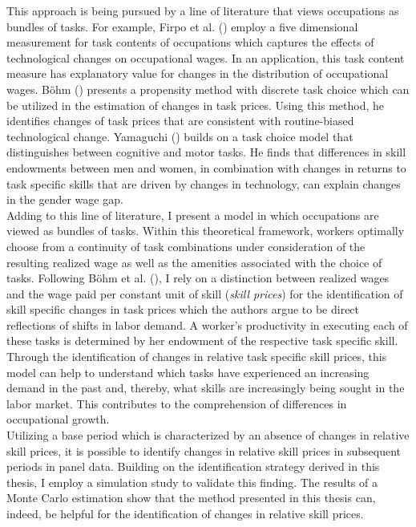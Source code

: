 \documentclass[../main.tex]{subfiles}
\begin{document}
This approach is being pursued by a line of literature that views occupations as bundles of tasks. For example, Firpo et al. (\citeyear{firpo2011occupational}) employ a five dimensional measurement for task contents of occupations which captures the effects of technological changes on occupational wages. In an application, this task content measure has explanatory value for changes in the distribution of occupational wages. Böhm (\citeyear{bohm2019price}) presents a propensity method with discrete task choice which can be utilized in the estimation of changes in task prices. Using this method, he identifies changes of task prices that are consistent with routine-biased technological change. Yamaguchi (\citeyear{yamaguchi2018changes}) builds on a task choice model that distinguishes between cognitive and motor tasks. He finds that differences in skill endowments between men and women, in combination with changes in returns to task specific skills that are driven by changes in technology, can explain changes in the gender wage gap.
\\
Adding to this line of literature, I present a model in which occupations are viewed as bundles of tasks. Within this theoretical framework, workers optimally choose from a continuity of task combinations under consideration of the resulting realized wage as well as the amenities associated with the choice of tasks. Following Böhm et al. (\citeyear{bohm2019occupation}), I rely on a distinction between realized wages and the wage paid per constant unit of skill (\textit{skill prices}) for the identification of skill specific changes in task prices which the authors argue to be direct reflections of shifts in labor demand. A worker's productivity in executing each of these tasks is determined by her endowment of the respective task specific skill.
\\
Through the identification of changes in relative task specific skill prices, this model can help to understand which tasks have experienced an increasing demand in the past and, thereby, what skills are increasingly being sought in the labor market. This contributes to the comprehension of differences in occupational growth.
\\
Utilizing a base period which is characterized by an absence of changes in relative skill prices, it is possible to identify changes in relative skill prices in subsequent periods in panel data. Building on the identification strategy derived in this thesis, I employ a simulation study to validate this finding. The results of a Monte Carlo estimation show that the method presented in this thesis can, indeed, be helpful for the identification of changes in relative skill prices.
\end{document}
